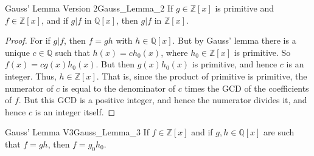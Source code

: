\documentclass{article}                                                        %
\begin{document}
        \begin{ltheorem}{Gauss' Lemma Version 2}{Gauss_Lemma_2}
            If $g\in\mathbb{Z}[x]$ is primitive and $f\in\mathbb{Z}[x]$, and if
            $g|f$ in $\mathbb{Q}[x]$, then $g|f$ in $\mathbb{Z}[x]$.
        \end{ltheorem}
        \begin{proof}
            For if $g|f$, then $f=gh$ with $h\in\mathbb{Q}[x]$. But by Gauss'
            lemma there is a unique $c\in\mathbb{Q}$ such that
            $h(x)=ch_{0}(x)$, where $h_{0}\in\mathbb{Z}[x]$ is primitive. So
            $f(x)=cg(x)h_{0}(x)$. But then $g(x)h_{0}(x)$ is primitive, and
            hence $c$ is an integer. Thus, $h\in\mathbb{Z}[x]$. That is, since
            the product of primitive is primitive, the numerator of $c$ is equal
            to the denominator of $c$ times the GCD of the coefficients of $f$.
            But this GCD is a positive integer, and hence the numerator divides
            it, and hence $c$ is an integer itself.
        \end{proof}
        \begin{ltheorem}{Gauss' Lemma V3}{Gauss_Lemma_3}
            If $f\in\mathbb{Z}[x]$ and if $g,h\in\mathbb{Q}[x]$ are such that
            $f=gh$, then $f=g_{0}h_{0}$.
        \end{ltheorem}
\end{document}
